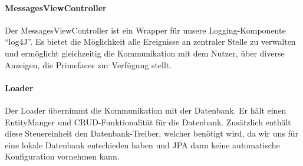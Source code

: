 \paragraph{MessagesViewController}
Der MessagesViewController ist ein Wrapper für unsere Logging-Komponente \enquote{log4J}. Es bietet die Möglichkeit alle Ereignisse
an zentraler Stelle zu verwalten und ermöglicht gleichzeitig die Kommunikation mit dem Nutzer, über diverse Anzeigen, die Primefaces
zur Verfügung stellt.

\paragraph{Loader}

Der Loader übernimmt die Kommunikation mit der Datenbank. Er hält einen EntityManger und \acs{CRUD}-Funktionalität für die Datenbank.
Zusätzlich enthält diese Steuereinheit den Datenbank-Treiber, welcher benötigt wird, da wir uns für eine lokale Datenbank entschieden haben
und \acs{JPA} dann keine automatische Konfiguration vornehmen kann.



